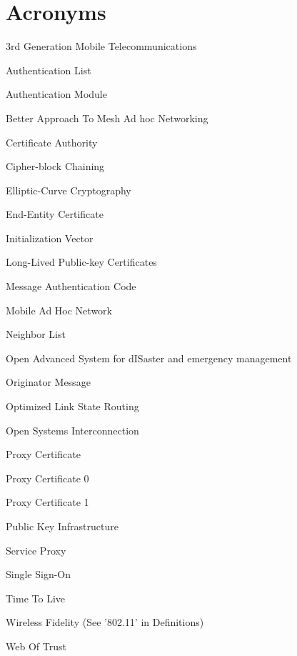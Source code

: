 \chapter*{Acronyms}

\begin{acronym}

 {3rd Generation Mobile Telecommunications}


 {Authentication List}

 {Authentication Module}

 {Better Approach To Mesh Ad hoc Networking}

 {Certificate Authority}

 {Cipher-block Chaining}





 {Elliptic-Curve Cryptography}

 {End-Entity Certificate}

 {Initialization Vector}

 {Long-Lived Public-key Certificates}

 {Message Authentication Code}

 {Mobile Ad Hoc Network}


 {Neighbor List}

 {Open Advanced System for dISaster and emergency management}

 {Originator Message}

 {Optimized Link State Routing}

 {Open Systems Interconnection}

 {Proxy Certificate}

 {Proxy Certificate 0}

 {Proxy Certificate 1}


 {Public Key Infrastructure}



 {Service Proxy}

 {Single Sign-On}

 {Time To Live}


 {Wireless Fidelity (See '802.11' in Definitions)}

 {Web Of Trust}

\end{acronym}
